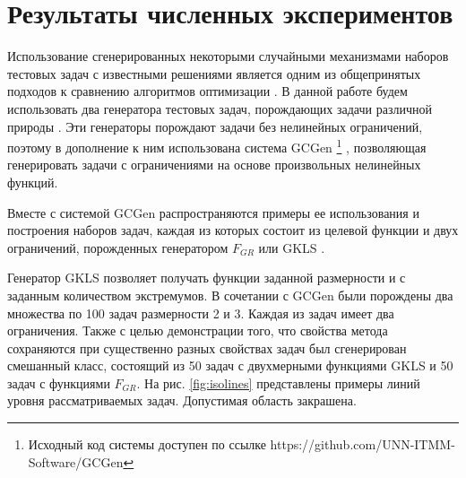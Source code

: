 \section{Результаты численных экспериментов}

Использование сгенерированных некоторыми случайными механизмами
наборов тестовых задач с известными решениями является одним из общепринятых подходов
к сравнению алгоритмов оптимизации \cite{Beiranvand2017}. В данной работе
будем использовать два генератора тестовых задач, порождающих задачи различной природы \cite{grishaginClass, Gaviano2003}.
Эти генераторы порождают задачи без нелинейных ограничений, поэтому в дополнение к ним использована
система GCGen \footnote{Исходный код системы доступен по ссылке https://github.com/UNN-ITMM-Software/GCGen} \cite{GergelBarkalov2019}, позволяющая генерировать задачи с ограничениями на основе произвольных нелинейных
функций.

Вместе с системой GCGen распространяются примеры ее использования и построения
наборов задач, каждая из которых состоит из целевой функции и двух ограничений,
порожденных генератором \(F_{GR}\) \cite{grishaginClass} или GKLS \cite{Gaviano2003}.


Генератор GKLS \cite{Gaviano2003} позволяет получать функции заданной размерности и с заданным количеством экстремумов.
В сочетании с GCGen были порождены два множества по 100 задач размерности 2 и 3. Каждая из задач имеет два ограничения.
Также с целью демонстрации того, что свойства метода сохраняются при существенно разных свойствах задач
был сгенерирован смешанный класс, состоящий из 50 задач с двухмерными функциями GKLS и 50 задач с функциями \(F_{GR}\).
На рис. \ref{fig:isolines} представлены примеры линий уровня рассматриваемых задач. Допустимая область закрашена.

